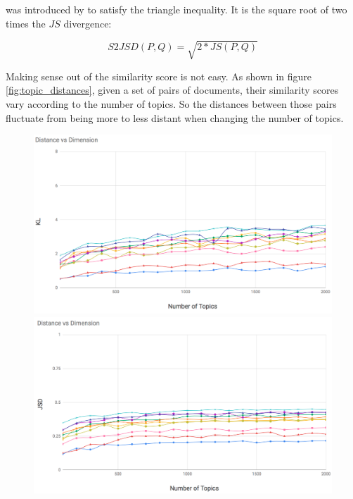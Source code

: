  was introduced by \cite{Endres2003} to satisfy the triangle inequality. It is the square root of two times the $JS$ divergence:

\begin{equation}
    S2JSD(P,Q) = \sqrt{2*JS(P,Q)}
\label{eq:s2jsd}
\end{equation}

Making sense out of the similarity score is not easy. As shown in figure \ref{fig:topic_distances}, given a set of pairs of documents, their similarity scores vary according to the number of topics. So the distances between those pairs fluctuate from being more to less distant when changing the number of topics.
\begin{figure}

\begin{adjustbox}{minipage=0.45\linewidth,frame=1pt 5pt}
\includegraphics[width=\linewidth]{KL_100_2k.png}
\end{adjustbox}
\hfill
\begin{adjustbox}{minipage=0.45\linewidth,frame=1pt 5pt}
\includegraphics[width=\linewidth]{JSD_100_2k.png}

\end{adjustbox}
\end{figure}
